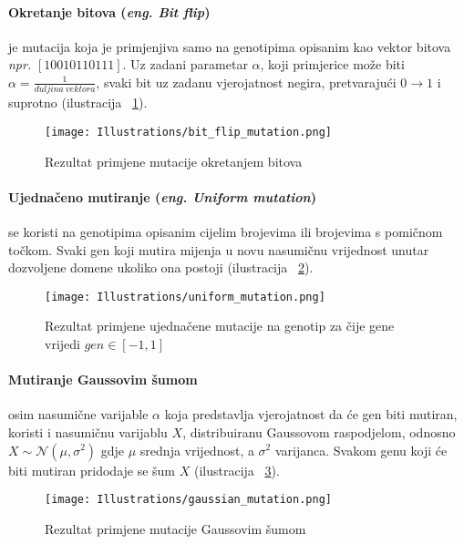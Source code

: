 \paragraph{Okretanje bitova (\emph{eng. Bit flip})} 
je mutacija koja je primjenjiva samo na genotipima opisanim kao vektor bitova \emph{npr.} $[1 0 0 1 0 1 1 0 1 1 1]$.
Uz zadani parametar $\alpha$, koji primjerice može biti $\alpha = \frac{1}{duljina\ vektora}$, svaki bit uz zadanu vjerojatnost negira, pretvarajući $0 \rightarrow 1$ i suprotno (ilustracija ~\ref{fig:bit_flip_mutation}).

\begin{figure}
	\centering
	\texttt{[image: Illustrations/bit\_flip\_mutation.png]}
	\caption{Rezultat primjene mutacije okretanjem bitova}
	\label{fig:bit_flip_mutation}
\end{figure}

\paragraph{Ujednačeno mutiranje (\emph{eng. Uniform mutation})}
se koristi na genotipima opisanim cijelim brojevima ili brojevima s pomičnom točkom.
Svaki gen koji mutira mijenja u novu nasumičnu vrijednost unutar dozvoljene domene ukoliko ona postoji (ilustracija ~\ref{fig:uniform_mutation}).

\begin{figure}
	\centering
	\texttt{[image: Illustrations/uniform\_mutation.png]}
	\caption{Rezultat primjene ujednačene mutacije na genotip za čije gene vrijedi $gen \in [-1, 1]$}
	\label{fig:uniform_mutation}
\end{figure}

\paragraph{Mutiranje Gaussovim šumom}
osim nasumične varijable $\alpha$ koja predstavlja vjerojatnost da će gen biti mutiran, koristi i nasumičnu varijablu $X$, distribuiranu Gaussovom raspodjelom, odnosno $X \sim \mathcal{N}(\mu,\sigma^2)$ gdje $\mu$ srednja vrijednost, a $\sigma^2$ varijanca.
Svakom genu koji će biti mutiran pridodaje se šum $X$ (ilustracija ~\ref{fig:gaussian_mutation}).

\begin{figure}
	\centering
	\texttt{[image: Illustrations/gaussian\_mutation.png]}
	\caption{Rezultat primjene mutacije Gaussovim šumom}
	\label{fig:gaussian_mutation}
\end{figure}


